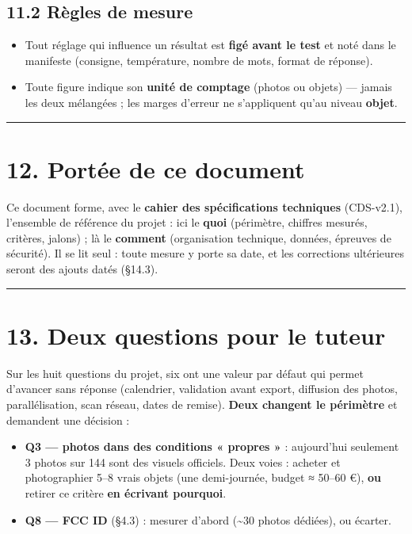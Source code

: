 \documentclass[11pt,a4paper]{article}
\begin{document}
\subsection*{11.2 Règles de mesure}
\begin{itemize}  \item Tout réglage qui influence un résultat est \textbf{figé avant le test} et noté dans le manifeste (consigne, température, nombre de mots, format de réponse).
\end{itemize}

\begin{itemize}  \item Toute figure indique son \textbf{unité de comptage} (photos ou objets) — jamais les deux mélangées ; les marges d'erreur ne s'appliquent qu'au niveau \textbf{objet}.
\end{itemize}

\medskip\hrule\medskip
\section*{12. Portée de ce document}
Ce document forme, avec le \textbf{cahier des spécifications techniques} (CDS-v2.1), l'ensemble de référence du projet : ici le \textbf{quoi} (périmètre, chiffres mesurés, critères, jalons) ; là le \textbf{comment} (organisation technique, données, épreuves de sécurité). Il se lit seul : toute mesure y porte sa date, et les corrections ultérieures seront des ajouts datés (§14.3).

\medskip\hrule\medskip
\section*{13. Deux questions pour le tuteur}
Sur les huit questions du projet, six ont une valeur par défaut qui permet d'avancer sans réponse (calendrier, validation avant export, diffusion des photos, parallélisation, scan réseau, dates de remise). \textbf{Deux changent le périmètre} et demandent une décision :

\begin{itemize}  \item \textbf{Q3 — photos dans des conditions « propres »} : aujourd'hui seulement 3 photos sur 144 sont des visuels officiels. Deux voies : acheter et photographier 5–8 vrais objets (une demi-journée, budget ≈ 50–60 €), \textbf{ou} retirer ce critère \textbf{en écrivant pourquoi}.
\end{itemize}

\begin{itemize}  \item \textbf{Q8 — FCC ID} (§4.3) : mesurer d'abord (\textasciitilde{}30 photos dédiées), ou écarter.
\end{itemize}
\end{document}
